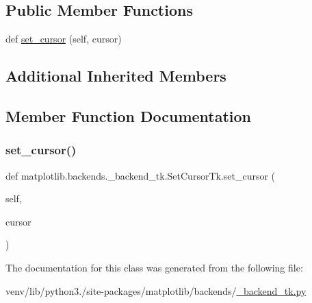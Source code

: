 \subsection*{Public Member Functions}
\begin{DoxyCompactItemize}
\item 
def \hyperlink{classmatplotlib_1_1backends_1_1__backend__tk_1_1SetCursorTk_a4128b80152003326792d77487063766b}{set\+\_\+cursor} (self, cursor)
\end{DoxyCompactItemize}
\subsection*{Additional Inherited Members}


\subsection{Member Function Documentation}
\mbox{\label{classmatplotlib_1_1backends_1_1__backend__tk_1_1SetCursorTk_a4128b80152003326792d77487063766b}} 
\subsubsection{\texorpdfstring{set\+\_\+cursor()}{set\_cursor()}}
{\footnotesize\ttfamily def matplotlib.\+backends.\+\_\+backend\+\_\+tk.\+Set\+Cursor\+Tk.\+set\+\_\+cursor (\begin{DoxyParamCaption}\item[{}]{self,  }\item[{}]{cursor }\end{DoxyParamCaption})}



The documentation for this class was generated from the following file\+:\begin{DoxyCompactItemize}
\item 
venv/lib/python3./site-\/packages/matplotlib/backends/\hyperlink{__backend__tk_8py}{\+\_\+backend\+\_\+tk.\+py}\end{DoxyCompactItemize}

